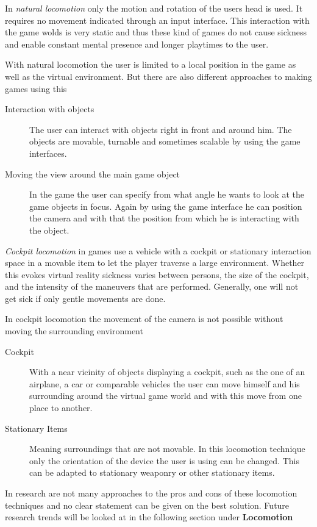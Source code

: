 In \textit{natural locomotion} only the motion and rotation of the users head is used. It requires no movement indicated through an input interface. This interaction with the game wolds is very static and thus these kind of games do not cause sickness and enable constant mental presence and longer playtimes to the user.

With natural locomotion the user is limited to a local position in the game as well as the virtual environment. But there are also different approaches to making games using this 
\begin{description}
	\item[Interaction with objects]The user can interact with objects right in 
	front and around him. The objects are movable, turnable and sometimes 
	scalable by using the game interfaces.
	\item[Moving the view around the main game object]In the game the user can 
	specify from what angle he wants to look at the game objects in focus. 
	Again by using the game interface he can position the camera and with that 
	the position from which he is interacting with the object.
\end{description}

\textit{Cockpit locomotion} in games use a vehicle with a cockpit or stationary interaction space in a movable item to let the player traverse a large environment. Whether this evokes virtual reality sickness varies between persons, the size of the cockpit, and the intensity of the maneuvers that are performed. Generally, one will not get sick if only gentle movements are done.

In cockpit locomotion the movement of the camera is not possible without moving 
the surrounding environment
\begin{description}
	\item[Cockpit]With a near vicinity of objects displaying a cockpit, such as 
	the one of an airplane, a car or comparable vehicles the user can move 
	himself and his surrounding around the virtual game world and with this 
	move from one place to another.
	\item[Stationary Items]Meaning surroundings that are not movable. In this 
	locomotion technique only the orientation of the device the user is using 
	can be changed. This can be adapted to stationary weaponry or other 
	stationary items.
\end{description}

In research are not many approaches to the pros and cons of these locomotion 
techniques and no clear statement can be given on the best solution. 
Future research trends will be looked at in the following section under 
\textbf{Locomotion}


